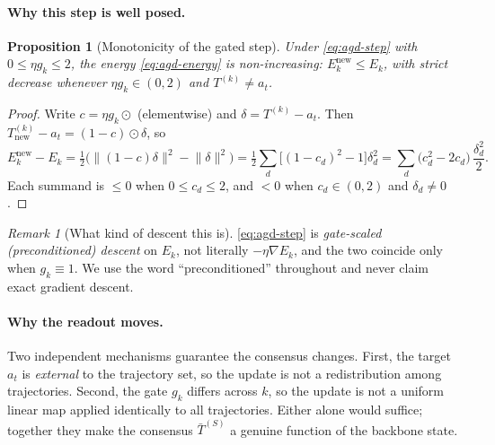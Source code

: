 \documentclass[11pt,a4paper]{article}
\newcommand{\etadim}{\eta}
\theoremstyle{plain}
\newtheorem{proposition}{Proposition}
\theoremstyle{definition}
\theoremstyle{remark}
\newtheorem{remark}{Remark}
\begin{document}
\paragraph{Why this step is well posed.}
\begin{proposition}[Monotonicity of the gated step]
\label{prop:agd-monotone}
Under \eqref{eq:agd-step} with $0 \le \etadim g_k \le 2$, the energy
\eqref{eq:agd-energy} is non-increasing: $E_k^{\text{new}} \le E_k$, with
strict decrease whenever $\etadim g_k \in (0,2)$ and $T^{(k)} \neq a_t$.
\end{proposition}
\begin{proof}
Write $c = \etadim g_k \odot$ (elementwise) and $\delta = T^{(k)} - a_t$. Then
$T^{(k)}_{\text{new}} - a_t = (1-c)\odot\delta$, so
\begin{equation}
  E_k^{\text{new}} - E_k = \tfrac{1}{2}\bigl(\lVert (1-c)\delta\rVert^2 - \lVert \delta \rVert^2\bigr)
  = \tfrac{1}{2}\sum_d \bigl[(1-c_d)^2 - 1\bigr]\delta_d^2
  = \sum_d \bigl(c_d^2 - 2c_d\bigr)\,\frac{\delta_d^2}{2}.
\end{equation}
Each summand is $\le 0$ when $0 \le c_d \le 2$, and $<0$ when
$c_d \in (0,2)$ and $\delta_d \neq 0$.
\end{proof}

\noindent
\begin{remark}[What kind of descent this is]
\eqref{eq:agd-step} is \emph{gate-scaled (preconditioned) descent} on
$E_k$, not literally $-\etadim \nabla E_k$, and the two coincide only when
$g_k \equiv 1$. We use the word ``preconditioned'' throughout and never claim
exact gradient descent.
\end{remark}

\paragraph{Why the readout moves.}
Two independent mechanisms guarantee the consensus changes. First, the target
$a_t$ is \emph{external} to the trajectory set, so the update is not a
redistribution among trajectories. Second, the gate $g_k$ differs across $k$,
so the update is not a uniform linear map applied identically to all
trajectories. Either alone would suffice; together they make the consensus
$\bar T^{(S)}$ a genuine function of the backbone state.
\end{document}
